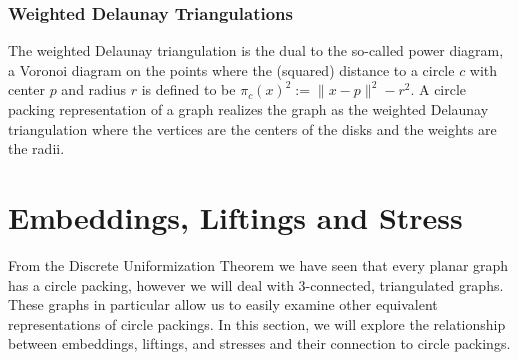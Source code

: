 \documentclass[11pt]{article}
\begin{document}

\subsubsection{Weighted Delaunay Triangulations}
The weighted Delaunay triangulation is the dual to the so-called power diagram, a Voronoi diagram on the points where the (squared) distance to a circle $c$ with center $p$ and radius $r$ is defined to be $\pi_c(x)^2 := \|x-p\|^2 - r^2$.
  A circle packing representation of a graph realizes the graph as the weighted Delaunay triangulation where the vertices are the centers of the disks and the weights are the radii.
  
\section{Embeddings, Liftings and Stress}
From the Discrete Uniformization Theorem we have seen that every planar graph has a circle packing, however we will deal with 3-connected, triangulated graphs. These graphs in particular allow us to easily examine other equivalent representations of circle packings. In this section, we will explore the relationship between embeddings, liftings, and stresses and their connection to circle packings.
\end{document}
